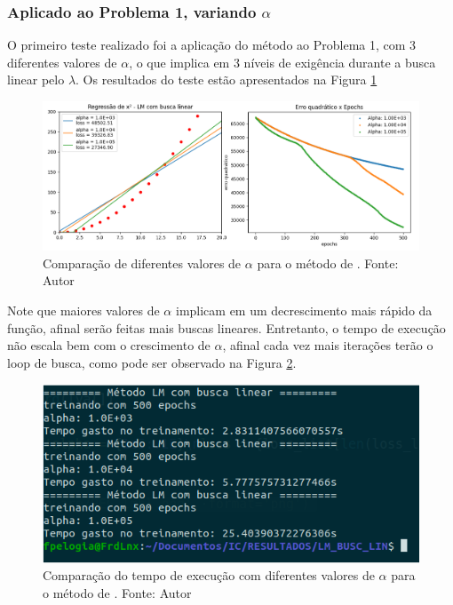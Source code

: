 \documentclass[11pt]{article}
\begin{document}
\subsubsection*{Aplicado ao Problema 1, variando $\alpha$}
O primeiro teste realizado foi a aplicação do método ao Problema 1, com 3 diferentes valores de $\alpha$, o que implica em 3 níveis de exigência durante a busca linear pelo $\lambda$. Os resultados do teste estão apresentados na Figura \ref{LMBL_SQ} 
\begin{figure}[H]
\center
\includegraphics[scale=0.5]{Figuras/REG_lmbl.png}
\caption{Comparação de diferentes valores de $\alpha$ para o método de  \cite{bmLS}. Fonte: Autor} 
\label{LMBL_SQ}
\end{figure}
Note que maiores valores de $\alpha$ implicam em um decrescimento mais rápido da função, afinal serão feitas mais buscas lineares. Entretanto, o tempo de execução não escala bem com o crescimento de $\alpha$, afinal cada vez mais iterações terão o loop de busca, como pode ser observado na Figura \ref{LMBL_time}.
\begin{figure}[H]
\center
\includegraphics[scale=0.6]{Figuras/lmbl_square_t.png}
\caption{Comparação do tempo de execução com diferentes valores de $\alpha$ para o método de  \cite{bmLS}. Fonte: Autor} 
\label{LMBL_time}
\end{figure}
\end{document}
